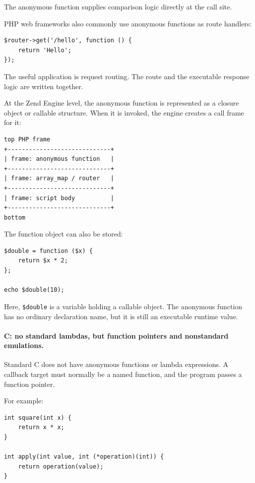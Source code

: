 \documentclass[a4paper,twoside]{report}
\begin{document}
The anonymous function supplies comparison logic directly at the call site.

PHP web frameworks also commonly use anonymous functions as route handlers:

\begin{verbatim}
$router->get('/hello', function () {
    return 'Hello';
});
\end{verbatim}

The useful application is request routing. The route and the executable response logic are written together.

At the Zend Engine level, the anonymous function is represented as a closure object or callable structure. When it is invoked, the engine creates a call frame for it:

\begin{verbatim}
top PHP frame
+-----------------------------+
| frame: anonymous function   |
+-----------------------------+
| frame: array_map / router   |
+-----------------------------+
| frame: script body          |
+-----------------------------+
bottom
\end{verbatim}

The function object can also be stored:

\begin{verbatim}
$double = function ($x) {
    return $x * 2;
};

echo $double(10);
\end{verbatim}

Here, \texttt{\$double} is a variable holding a callable object. The anonymous function has no ordinary declaration name, but it is still an executable runtime value.

\paragraph{C: no standard lambdas, but function pointers and nonstandard emulations.}

Standard C does not have anonymous functions or lambda expressions. A callback target must normally be a named function, and the program passes a function pointer.

For example:

\begin{verbatim}
int square(int x) {
    return x * x;
}

int apply(int value, int (*operation)(int)) {
    return operation(value);
}
\end{verbatim}
\end{document}

